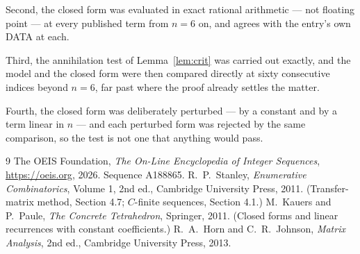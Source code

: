 \documentclass[11pt,a4paper]{article}
\theoremstyle{plain}
\theoremstyle{definition}
\begin{document}
Second, the closed form was evaluated in exact rational arithmetic --- not floating point ---
at every published term from $n=6$ on, and agrees with the entry's own DATA at each.

Third, the annihilation test of Lemma~\ref{lem:crit} was carried out exactly, and the model
and the closed form were then compared directly at sixty consecutive indices beyond
$n=6$, far past where the proof already settles the matter.

Fourth, the closed form was deliberately perturbed --- by a constant and by a term linear in
$n$ --- and each perturbed form was rejected by the same comparison, so the test is not one
that anything would pass.

\begin{thebibliography}{9}
 The OEIS Foundation, \emph{The On-Line Encyclopedia of Integer
Sequences}, \url{https://oeis.org}, 2026. Sequence A188865.
 R.~P.~Stanley, \emph{Enumerative Combinatorics}, Volume 1, 2nd ed.,
Cambridge University Press, 2011. (Transfer-matrix method, Section 4.7; $C$-finite sequences,
Section 4.1.)
 M.~Kauers and P.~Paule, \emph{The Concrete Tetrahedron}, Springer, 2011.
(Closed forms and linear recurrences with constant coefficients.)
 R.~A.~Horn and C.~R.~Johnson, \emph{Matrix Analysis}, 2nd ed., Cambridge
University Press, 2013.
\end{thebibliography}
\end{document}
